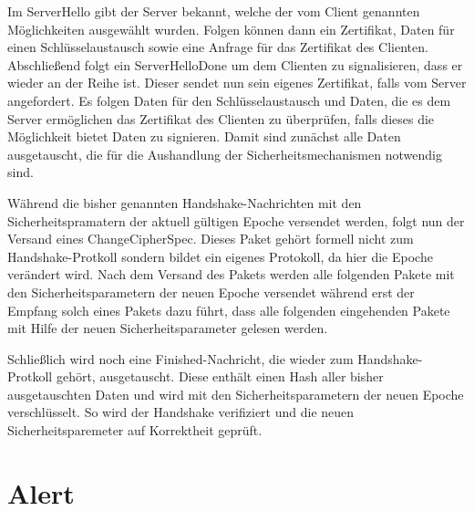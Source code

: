 Im ServerHello gibt der Server bekannt, welche der vom Client genannten Möglichkeiten ausgewählt wurden. Folgen können dann ein Zertifikat, Daten für einen Schlüsselaustausch
sowie eine Anfrage für das Zertifikat des Clienten. Abschließend folgt ein ServerHelloDone um dem Clienten zu signalisieren, dass er wieder an der Reihe ist. Dieser sendet
nun sein eigenes Zertifikat, falls vom Server angefordert. Es folgen Daten für den Schlüsselaustausch und Daten, die es dem Server ermöglichen das Zertifikat des Clienten
zu überprüfen, falls dieses die Möglichkeit bietet Daten zu signieren. Damit sind zunächst alle Daten ausgetauscht, die für die Aushandlung der Sicherheitsmechanismen
notwendig sind.

Während die bisher genannten Handshake-Nachrichten mit den Sicherheitspramatern der aktuell gültigen Epoche versendet werden, folgt nun der Versand eines
ChangeCipherSpec. Dieses Paket gehört formell nicht zum Handshake-Protkoll sondern bildet ein eigenes Protokoll, da hier die Epoche verändert wird.
Nach dem Versand des Pakets werden alle folgenden Pakete mit den Sicherheitsparametern der neuen Epoche versendet während erst der Empfang solch eines
Pakets dazu führt, dass alle folgenden eingehenden Pakete mit Hilfe der neuen Sicherheitsparameter gelesen werden.

Schließlich wird noch eine Finished-Nachricht, die wieder zum Handshake-Protkoll gehört, ausgetauscht. Diese enthält einen Hash aller bisher ausgetauschten Daten
und wird mit den Sicherheitsparametern der neuen Epoche verschlüsselt. So wird der Handshake verifiziert und die neuen Sicherheitsparemeter auf Korrektheit geprüft.

\section{Alert}

